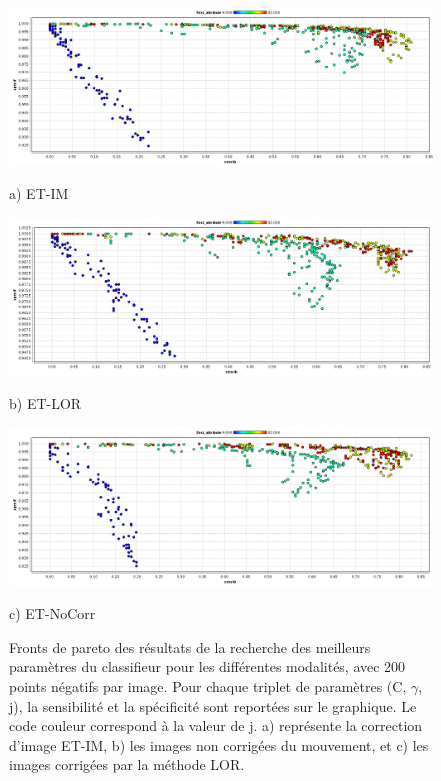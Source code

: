 \begin{figure}[h!]

\begin{center}
 \includegraphics[width=14cm]{images/pareto_mod_IM.png}

{\small a) ET-IM}
\vspace{0.5cm}

\includegraphics[width=14cm]{images/pareto_mod_LOR.png}
 
{\small b) ET-LOR}
\vspace{0.5cm}

\includegraphics[width=14cm]{images/pareto_mod_NoCorr.png}

{\small c) ET-NoCorr}

\end{center}
 \caption{Fronts de pareto des résultats de la recherche des meilleurs paramètres du classifieur pour les différentes modalités, avec 200 points négatifs par image. Pour chaque triplet de paramètres (C, $\gamma$, j), la sensibilité et la spécificité sont reportées sur le graphique. Le code couleur correspond à la valeur de j. a) représente la correction d'image ET-IM, b) les images non corrigées du mouvement, et c) les images corrigées par la méthode LOR.}
\label{fig:paretoModalite} 
\end{figure}









